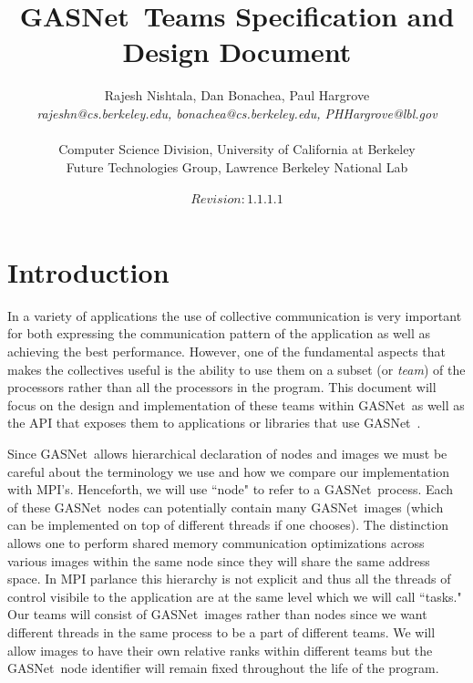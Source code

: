\documentclass[times,10pt]{article}
\begin{document}
\newcommand{\gasnet}[0]{GASNet\ }





\title{\gasnet Teams Specification and Design Document}
\author{Rajesh Nishtala, Dan Bonachea, Paul Hargrove\\
    \emph{rajeshn@cs.berkeley.edu, bonachea@cs.berkeley.edu, PHHargrove@lbl.gov} \\\\
    Computer Science Division, University of California at Berkeley \\ 
    Future Technologies Group, Lawrence Berkeley National Lab\\ \\
    $Revision: 1.1.1.1 $ }
\maketitle


\section{Introduction}
In a variety of applications the use of collective communication is very
important for both expressing the communication pattern of the application as
well as achieving the best performance. However, one of the fundamental aspects
that makes the collectives useful is the ability to use them on a subset (or
\textit{team}) of the processors rather than all the processors in the program.
This document will focus on the design and implementation of these teams within
\gasnet as well as the API that exposes them to applications or libraries that
use \gasnet. 

Since \gasnet allows hierarchical declaration of nodes and images we must be
careful about the terminology we use and how we compare our implementation with
MPI's. Henceforth, we will use ``node" to refer to a \gasnet process. Each of
these \gasnet nodes can potentially contain many  \gasnet images (which can be
implemented on top of different threads if one chooses). The distinction allows
one to perform shared memory communication optimizations across various images
within the same node since they will share the same address space. In MPI
parlance this hierarchy is not explicit and thus all the threads of control
visibile to the application are at the same level which we will call ``tasks."
Our teams will consist of \gasnet images rather than nodes since we want
different threads in the same process to be a part of different teams. We will
allow images to have their own relative ranks within different teams but the
\gasnet node identifier will remain fixed throughout the life of the program. 
\end{document}

